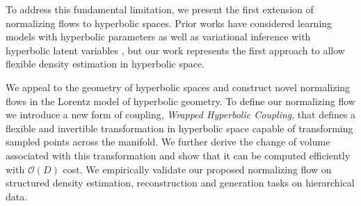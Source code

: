 To address this fundamental limitation, we present the first extension of normalizing flows to hyperbolic spaces. 
Prior works have considered learning models with hyperbolic parameters  \cite{liu2019hyperbolic,nickel2018learning} as well as variational inference with hyperbolic latent variables \cite{nagano2019wrapped,mathieu2019continuous}, but our work represents the first approach to allow flexible density estimation in hyperbolic space. 

We appeal to the geometry of hyperbolic spaces and construct novel normalizing flows in the Lorentz model of hyperbolic geometry. 
To define our normalizing flow we introduce a new form of coupling, {\em Wrapped Hyperbolic Coupling}, that defines a flexible and invertible transformation in hyperbolic space capable of transforming sampled points across the manifold. 
We further derive the change of volume associated with this transformation and show that it can be computed efficiently with $\mathcal{O}(D)$ cost. 
We empirically validate our proposed normalizing flow on structured density estimation, reconstruction and generation tasks on hierarchical data. 

